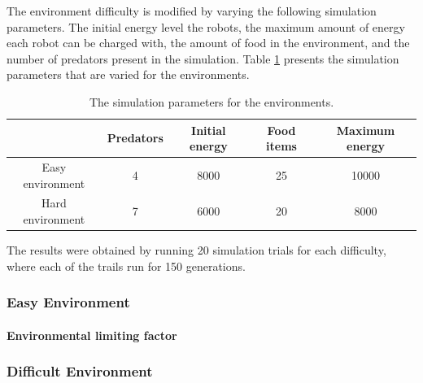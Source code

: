 The environment difficulty is modified by varying the following simulation parameters.
The initial energy level the robots, the maximum amount of energy each robot can be charged with, the amount of food in the environment, and the number of predators present in the simulation.
Table \ref{tab:environment-difficulty} presents the simulation parameters that are varied for the environments.

\begin{table}[H]
	\centering
	\label{tab:environment-difficulty}
	\begin{tabular}{|c|c|c|c|c|}
		\hline  & Predators & Initial energy & Food items & Maximum energy \\ 
		\hline Easy environment & 4 & 8000 & 25 & 10000 \\ 
		\hline Hard environment & 7 & 6000 & 20 &8000 \\ 
		\hline 
		
	\end{tabular} 
	\caption{The simulation parameters for the environments.}
\end{table}

The results were obtained by running 20 simulation trials for each difficulty, where each of the trails run for 150 generations.
\subsubsection{Easy Environment}

\newpage
\pagestyle{plain}

%

\newpage

\paragraph{Environmental limiting factor}

\subsubsection{Difficult Environment}

